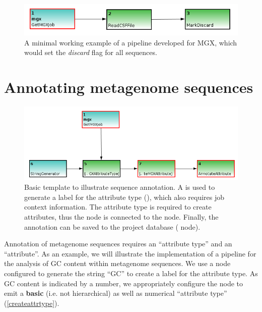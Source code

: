 \begin{figure}[H]
\centering
\includegraphics[width=.8\textwidth]{img/conveyor/simple}
\caption[Minimal example]{A minimal working example of a pipeline developed for MGX, which would set the \textit{discard} flag for all sequences.}
\label{simple}
\end{figure}


\section{Annotating metagenome sequences}

\begin{figure}[H]
\centering
\includegraphics[width=.8\textwidth]{img/conveyor/annotate_templ}
\caption[Metagenome annotation]{Basic template to illustrate sequence annotation. A  is
used to generate a label for the attribute type (), which also requires job context
information. The attribute type is required to create attributes, thus the node is connected to the  node. Finally, the annotation can be saved to the project database ( node).}
\label{annot}
\end{figure}

Annotation of metagenome sequences requires an ``attribute type'' and an ``attribute''. As an example, we will
illustrate the implementation of a pipeline for the analysis of GC content within metagenome sequences.
We use a  node configured to generate the string ``GC'' to create a label for the
attribute type. As GC content is indicated by a number, we appropriately configure the 
node to emit a \textbf{basic} (i.e. not hierarchical) as well as numerical ``attribute type'' (\ref{createattrtype}).

